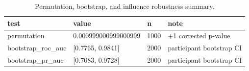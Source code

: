 \begin{table}[t]
\centering
\small
\caption{Permutation, bootstrap, and influence robustness summary.}
\label{tab:robustness}
\begin{tabular}{llll}
\toprule
test & value & n & note \\
\midrule
permutation & 0.000999000999000999 & 1000 & +1 corrected p-value \\
bootstrap\_roc\_auc & [0.7765, 0.9841] & 2000 & participant bootstrap CI \\
bootstrap\_pr\_auc & [0.7083, 0.9728] & 2000 & participant bootstrap CI \\
\bottomrule
\end{tabular}
\end{table}
